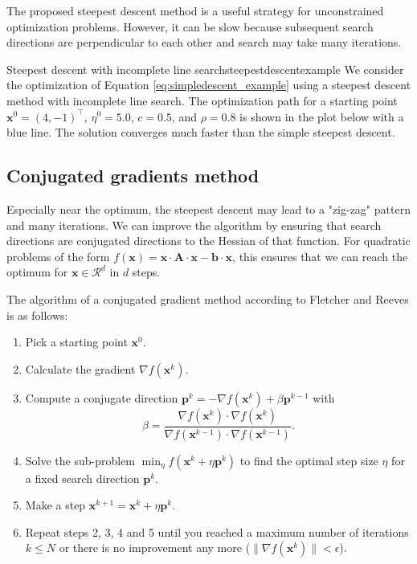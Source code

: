The proposed steepest descent method is a useful strategy for unconstrained optimization problems. However, it can be slow because subsequent search directions are perpendicular to each other and search may take many iterations.

\begin{example}{Steepest descent with incomplete line search}{steepestdescentexample}
    We consider the optimization of Equation \eqref{eq:simpledescent_example} using a steepest descent method with incomplete line search. The optimization path for a starting point $\mathbf{x}^0= (4, -1)^\top$, $\eta^0=5.0$, $c=0.5$, and $\rho=0.8$ is shown in the plot below with a blue line. The solution converges much faster than the simple steepest descent.
    \begin{center}
        
    \end{center}   
\end{example}

\subsection{Conjugated gradients method}
Especially near the optimum, the steepest descent may lead to a "zig-zag" pattern and many iterations. We can improve the algorithm by ensuring that search directions are conjugated directions to the Hessian of that function. For quadratic problems of the form $f(\mathbf{x}) = \mathbf{x} \cdot \mathbf{A} \cdot \mathbf{x} - \mathbf{b} \cdot \mathbf{x}$, this ensures that we can reach the optimum for $\mathbf{x} \in \mathcal{R}^d$ in $d$ steps.

The algorithm of a conjugated gradient method according to Fletcher and Reeves \cite{Fletcher1964} is as follows: 
\begin{enumerate}
    \item Pick a starting point $\mathbf{x}^0$.
    \item Calculate the gradient $\nabla f(\mathbf{x}^k)$.
    \item Compute a conjugate direction $\mathbf{p}^k = -\nabla f(\mathbf{x}^k) + \beta \mathbf{p}^{k-1}$ with  
    \begin{equation}
        \beta = \frac{\nabla f(\mathbf{x}^k) \cdot \nabla f(\mathbf{x}^k)}{\nabla f(\mathbf{x}^{k-1}) \cdot \nabla f(\mathbf{x}^{k-1})}.
    \end{equation}
    \item Solve the sub-problem $\min_{\eta} f(\mathbf{x}^k + \eta \mathbf{p}^k)$ to find the optimal step size $\eta$ for a fixed search direction $\mathbf{p}^k$.
    \item Make a step $\mathbf{x}^{k+1} = \mathbf{x}^k + \eta \mathbf{p}^k$.
    \item Repeat steps 2, 3, 4 and 5 until you reached a maximum number of iterations $k \le N$ or there is no improvement any more ($\lVert \nabla f(\mathbf{x}^k) \rVert < \epsilon$). 
\end{enumerate}

